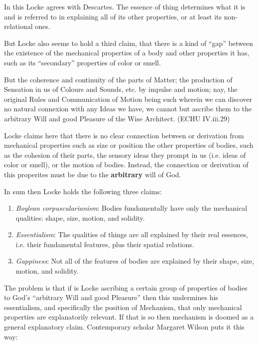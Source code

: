 \documentclass[12pt]{article}
\begin{document}
In this Locke agrees with Descartes. The essence of thing determines what it is and
is referred to in explaining all of its other properties, or at least its
non-relational ones.

But Locke also seems to hold a third claim, that there is a kind of ``gap'' between the
existence of the mechanical properties of a body and other properties it has, such as
its ``secondary'' properties of color or smell.

\begin{quote-b}
But the coherence and continuity of the parts of Matter; the production of Sensation
in us of Colours and Sounds, etc. by impulse and motion; nay, the original Rules and
Communication of Motion being such wherein we can discover no natural connexion with
any Ideas we have, we cannot but ascribe them to the arbitrary Will and good Pleasure
of the Wise Architect. (ECHU IV.iii.29)
\end{quote-b}

Locke claims here that there is no clear connection between or derivation from
mechanical properties such as size or position the other properties of bodies, such
as the cohesion of their parts, the sensory ideas they prompt in us (i.e. ideas of
color or smell), or the motion of bodies. Instead, the connection or derivation of
this properites must be due to the \textbf{arbitrary} will of God. 

In sum then Locke holds the following three claims: 


\begin{enumerate}
\item \emph{Boylean corpuscularianism}: Bodies fundamentally have only the
mechanical qualities: shape, size, motion, and solidity.
\item \emph{Essentialism}: The qualities of things are all explained by their real
essences, i.e. their fundamental features, plus their spatial relations.
\item \emph{Gappiness}: Not all of the features of bodies are explained by their
shape, size, motion, and solidity.
\end{enumerate}


The problem is that if is Locke ascribing a certain group of properties of bodies to
God's ``arbitrary Will and good Pleasure'' then this undermines his essentialism, and
specifically the position of Mechanism, that only mechanical properties are
explanatorily relevant. If that is so then mechanism is doomed as a general
explanatory claim. Contemporary scholar Margaret Wilson puts it this way:
\end{document}
